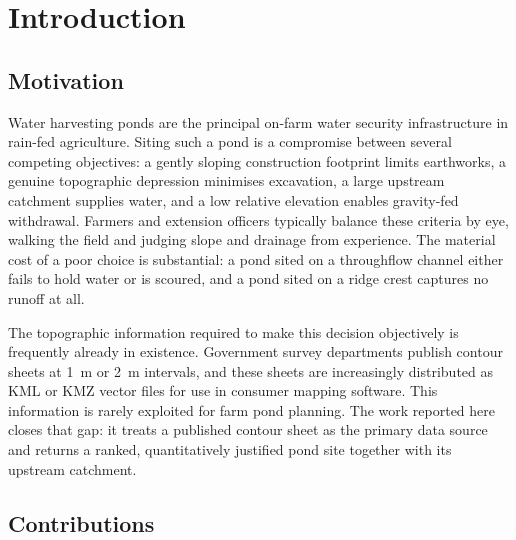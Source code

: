 \documentclass[sigconf,review,10pt]{acmart}
\begin{document}

\maketitle

\section{Introduction}

\subsection{Motivation}

Water harvesting ponds are the principal on-farm water security
infrastructure in rain-fed agriculture. Siting such a pond is a
compromise between several competing objectives: a gently sloping
construction footprint limits earthworks, a genuine topographic depression
minimises excavation, a large upstream catchment supplies water, and a low
relative elevation enables gravity-fed withdrawal. Farmers and extension
officers typically balance these criteria by eye, walking the field and
judging slope and drainage from experience. The material cost of a poor
choice is substantial: a pond sited on a throughflow channel either
fails to hold water or is scoured, and a pond sited on a ridge crest
captures no runoff at all.

The topographic information required to make this decision objectively is
frequently already in existence. Government survey departments publish
contour sheets at 1~m or 2~m intervals, and these sheets are increasingly
distributed as KML or KMZ vector files for use in consumer mapping
software. This information is rarely exploited for farm pond planning.
The work reported here closes that gap: it treats a published contour
sheet as the primary data source and returns a ranked, quantitatively
justified pond site together with its upstream catchment.

\subsection{Contributions}
\end{document}
